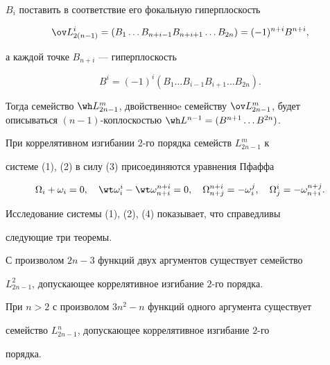 $B_i$ поставить в соответствие его фокальную гиперплоскость 


$$ 


\ov L^i_{2(n-1)}=(B_1\dotsc B_{n+i-1}B_{n+i+1}\dotsc B_{2n})= 


(-1)^{n+i}B^{n+i}, 


$$ 


а каждой точке $B_{n+i}$ --- гиперплоскость 


$$ 


B^i=(-1)^i(B_1\dotsc B_{i-1}B_{i+1}\dotsc B_{2n}). 


$$ 


Тогда семейство $\wh L^m_{2n-1}$, двойственноe семейству $\ov 


L^m_{2n-1}$, будет описываться $(n-1)$-коплоскостью $\wh 


L^{n-1}=(B^{n+1}\dotsc B^{2n})$. 


 


При коррелятивном изгибании 2-го порядка семейств $L^m_{2n-1}$ к 


системе (1), (2) в силу (3) присоединяются уравнения Пфаффа 


\begin{equation} 


\Omega_i+\omega_i=0,\quad \wt\omega^i_i-\wt\omega^{n+i}_{n+i}=0,\quad 


\Omega^{n+i}_{n+j}=-\omega^j_i,\quad 


\Omega^i_j=-\omega^{n+j}_{n+i}. 


\end{equation} 


 


Исследование системы (1), (2), (4) показывает, что справедливы 


следующие три теоремы. 


 


\begin{thm} 


С произволом $2n-3$ функций двух аргументов существует семейство 


$L^2_{2n-1}$, допускающее коррелятивное изгибание $2$-го порядка. 


\end{thm} 


 


\begin{thm} 


При $n>2$ с произволом $3n^2-n$ функций одного аргумента существует 


семейство $L^n_{2n-1}$, допускающее коррелятивное изгибание $2$-го 


порядка. 


\end{thm} 



